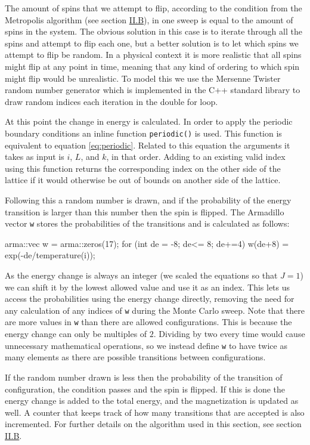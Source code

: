 \documentclass[reprint,english,notitlepage]{revtex4-1}  %
\begin{document}
The amount of spins that we attempt to flip, according to the condition from the Metropolis algorithm (see section \hyperref[sec:II:b]{II.B}), in one sweep is equal to the amount of spins in the system. The obvious solution in this case is to iterate through all the spins and attempt to flip each one, but a better solution is to let which spins we attempt to flip be random. In a physical context it is more realistic that all spins might flip at any point in time, meaning that any kind of ordering to which spin might flip would be unrealistic. To model this we use the Mersenne Twister random number generator \citep{MersenneTwister} which is implemented in the C++ standard library to draw random indices each iteration in the double for loop. 

At this point the change in energy is calculated. In order to apply the periodic boundary conditions an inline function \verb+periodic()+ is used. This function is equivalent to equation \eqref{eq:periodic}. Related to this equation the arguments it takes as input is $i$, $L$, and $k$, in that order. Adding to an existing valid index using this function returns the corresponding index on the other side of the lattice if it would otherwise be out of bounds on another side of the lattice.

Following this a random number is drawn, and if the probability of the energy transition is larger than this number then the spin is flipped. The Armadillo \citep{Armadillo} vector \verb+w+ stores the probabilities of the transitions and is calculated as follows:

\begin{cpp}
arma::vec w = arma::zeros(17);
for (int de = -8; de<= 8; de+=4) {
  w(de+8) = exp(-de/temperature(i));
}
\end{cpp} 

As the energy change is always an integer (we scaled the equations so that $J=1$) we can shift it by the lowest allowed value and use it as an index. This lets us access the probabilities using the energy change directly, removing the need for any calculation of any indices of \verb+w+ during the Monte Carlo sweep. Note that there are more values in \verb+w+ than there are allowed configurations. This is because the energy change can only be multiples of $2$. Dividing by two every time would cause unnecessary mathematical operations, so we instead define \verb+w+ to have twice as many elements as there are possible transitions between configurations.

If the random number drawn is less then the probability of the transition of configuration, the condition passes and the spin is flipped. If this is done the energy change is added to the total energy, and the magnetization is updated as well. A counter that keeps track of how many transitions that are accepted is also incremented. For further details on the algorithm used in this section, see section \hyperref[sec:II:b]{II.B}. 
\end{document}
